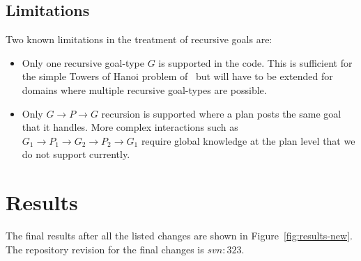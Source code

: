 \documentclass[a4paper]{article}
\begin{document}
\subsection{Limitations}
Two known limitations in the treatment of recursive goals are:
\begin{itemize}
\item Only one recursive goal-type $G$ is supported in the code. This is sufficient for the simple Towers of Hanoi problem of~\cite{Singh:HYCAS10} but will have to be extended for domains where multiple recursive goal-types are possible.
\item Only $G \to P \to G$ recursion is supported where a plan posts the same goal that it handles. More complex interactions such as $G_1 \to P_1 \to G_2 \to P_2 \to G_1$ require global knowledge at the plan level that we do not support currently.
\end{itemize}

\section{Results}

The final results after all the listed changes are shown in Figure~\ref{fig:results-new}. The repository revision for the final changes is $svn:323$.
\begin{figure*}[t]
\begin{center}
\qquad
{}
\qquad
{}
\qquad
{}
\caption{Agent performance under $ACL$ and $ACL+\Omega$ schemes. Each point represents results from $5$ experiment runs using an averaging window of $100$ samples. Repository revision $323$.}
\label{fig:results-new}
\end{center}
\end{figure*}
\end{document}
